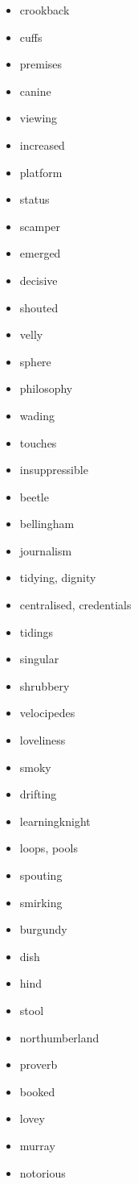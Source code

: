 \documentclass{article}
\begin{document}
\begin{itemize}
    \item crookback
    \item cuffs
    \item premises
    \item canine
    \item viewing
    \item increased
    \item platform
    \item status
    \item scamper
    \item emerged
    \item decisive
    \item shouted
    \item velly
    \item sphere
    \item philosophy
    \item wading
    \item touches
    \item insuppressible
    \item beetle
    \item bellingham
    \item journalism
    \item tidying, dignity
    \item centralised, credentials
    \item tidings
    \item singular
    \item shrubbery
    \item velocipedes
    \item loveliness
    \item smoky
    \item drifting
    \item learningknight
    \item loops, pools
    \item spouting
    \item smirking
    \item burgundy
    \item dish
    \item hind
    \item stool
    \item northumberland
    \item proverb
    \item booked
    \item lovey
    \item murray
    \item notorious

\end{itemize}
\end{document}
